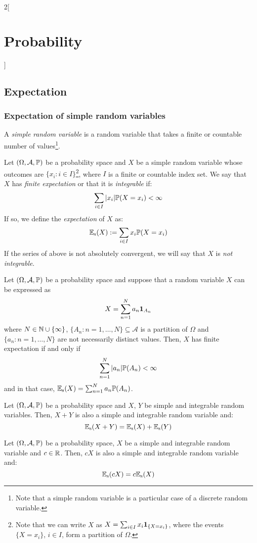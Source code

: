 \documentclass[../../../main_math.tex]{subfiles}
\begin{document}
\begin{multicols}{2}[\section{Probability}]
  \subsection{Expectation}\label{P:exp}
  \subsubsection{Expectation of simple random variables}
  \begin{definition}
    A \emph{simple random variable} is a random variable that takes a finite or countable number of values\footnote{Note that a simple random variable is a particular case of a discrete random variable.}.
  \end{definition}
  \begin{definition}
    Let $(\Omega,\mathcal{A},\mathbb{P})$ be a probability space and $X$ be a simple random variable whose outcomes are $\{x_i:i\in I\}$\footnote{Note that we can write $X$ as $X=\sum_{i\in I}x_i\boldsymbol{\mathrm{1}}_{\{X=x_i\}}$, where the events $\{X=x_i\}$, $i\in I$, form a partition of $\Omega$.}, where $I$ is a finite or countable index set. We say that $X$ has \emph{finite expectation} or that it is \emph{integrable} if: $$\sum_{i\in I}|x_i|\mathbb{P}(X=x_i)<\infty$$
    If so, we define the \emph{expectation} of $X$ as: $$\mathbb{E}_\text{s}(X):=\sum_{i\in I}x_i\mathbb{P}(X=x_i)$$ If the series of above is not absolutely convergent, we will say that $X$ is \emph{not integrable}.
  \end{definition}
  \begin{lemma}
    Let $(\Omega,\mathcal{A},\mathbb{P})$ be a probability space and suppose that a random variable $X$ can be expressed as $$X=\sum_{n=1}^Na_n\boldsymbol{\mathrm{1}}_{A_n}$$ where $N\in\mathbb{N}\cup\{\infty\}$, $\{A_n:n=1,\ldots,N\}\subseteq\mathcal{A}$ is a partition of $\Omega$ and $\{a_n:n=1,\ldots,N\}$ are not necessarily distinct values. Then, $X$ has finite expectation if and only if $$\sum_{n=1}^N|a_n|\mathbb{P}(A_n)<\infty$$ and in that case, $\mathbb{E}_\text{s}(X)=\sum_{n=1}^Na_n\mathbb{P}(A_n)$.
  \end{lemma}
  \begin{proposition}
    Let $(\Omega,\mathcal{A},\mathbb{P})$ be a probability space and $X$, $Y$ be simple and integrable random variables. Then, $X+Y$ is also a simple and integrable random variable and: $$\mathbb{E}_\text{s}(X+Y)=\mathbb{E}_\text{s}(X)+\mathbb{E}_\text{s}(Y)$$
  \end{proposition}
  \begin{proposition}
    Let $(\Omega,\mathcal{A},\mathbb{P})$ be a probability space, $X$ be a simple and integrable random variable and $c\in\mathbb{R}$. Then, $cX$ is also a simple and integrable random variable and: $$\mathbb{E}_\text{s}(cX)=c\mathbb{E}_\text{s}(X)$$

\end{proposition}
\end{multicols}
\end{document}

